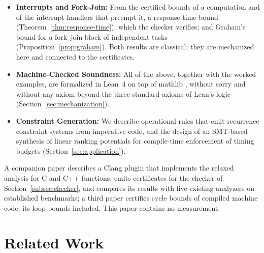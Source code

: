 \documentclass[oneside,english]{amsart}
\numberwithin{equation}{section}
\numberwithin{figure}{section}
\theoremstyle{plain}
\theoremstyle{definition}
\theoremstyle{plain}
\theoremstyle{remark}
\theoremstyle{plain}
\theoremstyle{definition}
\theoremstyle{plain}
\theoremstyle{remark}
\newcommand{\lean}[1]{{\ttfamily\small #1}}
\begin{document}
\begin{itemize}
    checked against the callee's summary and against assumed contracts instead of being inlined
    (Theorem~\ref{thm:program-soundness}). A certificate can also be validated against an independent
    description of the source in a small fragment of C, so that its bound holds for that description
    without trusting the producer of the certificate (Theorem~\ref{thm:validated}).
    \item \textbf{Interrupts and Fork-Join:} From the certified bounds of a computation and of the interrupt
    handlers that preempt it, a response-time bound (Theorem~\ref{thm:response-time}), which the checker
    verifies; and Graham's bound for a fork--join block of independent tasks (Proposition~\ref{prop:graham}).
    Both results are classical; they are mechanized here and connected to the certificates.
    \item \textbf{Machine-Checked Soundness:} All of the above, together with the worked examples, are formalized
    in Lean~4 \cite{demoura2021lean4} on top of mathlib \cite{mathlib2020}, without \lean{sorry} and without any axiom
    beyond the three standard axioms of Lean's logic (Section~\ref{sec:mechanization}).
    \item \textbf{Constraint Generation:} We describe operational rules that emit recurrence constraint systems from
    imperative code, and the design of an SMT-based synthesis of linear ranking potentials for compile-time
    enforcement of timing budgets (Section~\ref{sec:application}).
\end{itemize}

A companion paper \cite{crosscheckTool} describes a Clang plugin that implements the relaxed analysis for C and C++ functions, emits certificates for the checker of Section~\ref{subsec:checker}, and compares its results with five existing analyzers on established benchmarks; a third paper \cite{crosscheckBinary} certifies cycle bounds of compiled machine code, its loop bounds included. This paper contains no measurement.

\section{Related Work}
\label{sec:related}
\end{document}
